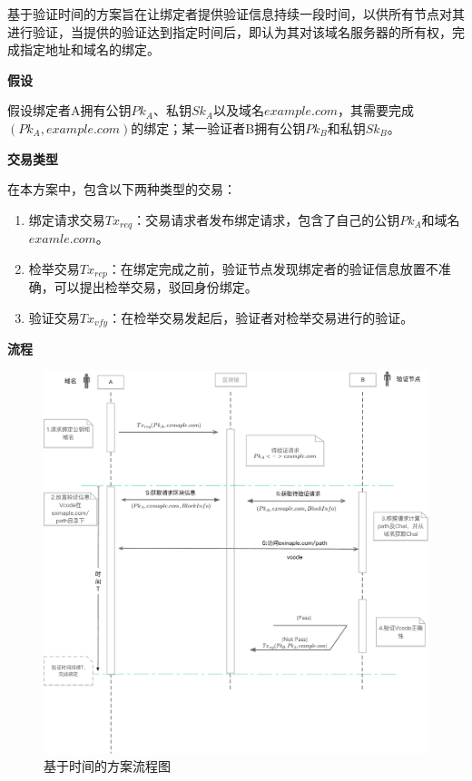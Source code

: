 基于验证时间的方案旨在让绑定者提供验证信息持续一段时间，以供所有节点对其进行验证，当提供的验证达到指定时间后，即认为其对该域名服务器的所有权，完成指定地址和域名的绑定。


\noindent\textbf{假设}

假设绑定者A拥有公钥$Pk_A$、私钥$Sk_A$以及域名$example.com$，其需要完成$(Pk_A, example.com)$的绑定；某一验证者B拥有公钥$Pk_B$和私钥$Sk_B$。

\noindent\textbf{交易类型}

在本方案中，包含以下两种类型的交易：

\begin{enumerate}
	\item 绑定请求交易$Tx_{req}$：交易请求者发布绑定请求，包含了自己的公钥$Pk_A$和域名$examle.com$。
	\item 检举交易$Tx_{rep}$：在绑定完成之前，验证节点发现绑定者的验证信息放置不准确，可以提出检举交易，驳回身份绑定。
	\item 验证交易$Tx_{vfy}$：在检举交易发起后，验证者对检举交易进行的验证。
\end{enumerate}

\noindent\textbf{流程}

\begin{figure}[!htbp]
 	\centering
 	\includegraphics[width = 1\textwidth]{img/time_based_workflow}
 	\caption{基于时间的方案流程图}\label{fig:time_based_workflow}
\end{figure}

